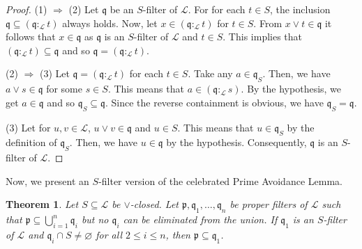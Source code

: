 \documentclass[preprint,review,10pt]{amsart}
\newtheorem{theorem}{Theorem}[section]
\theoremstyle{definition}
\theoremstyle{remark}
\numberwithin{equation}{section}
\begin{document}
\begin{proof}
(1) $\Longrightarrow$ (2) Let $\mathfrak {q}$ be an $S$-filter of $\mathscr{L}$. For for each $t \in S$, the inclusion $\mathfrak {q} \subseteq (\mathfrak {q} :_{\mathscr{L}}t)$ always holds. Now, let $x \in (\mathfrak {q} :_{\mathscr{L}}t)$ for $t \in S$. From $x \vee t \in \mathfrak {q}$ it follows that $x \in \mathfrak {q}$ as  $\mathfrak {q}$ is an $S$-filter of $\mathscr{L}$ and $t \in S$. This implies that $(\mathfrak {q} :_{\mathscr{L}}t) \subseteq \mathfrak {q}$ and so  $\mathfrak {q}=(\mathfrak {q} :_{\mathscr{L}}t)$.

(2) $\Longrightarrow$ (3) Let $\mathfrak {q}=(\mathfrak {q} :_{\mathscr{L}}t)$ for each $t \in S$. Take any $a \in \mathfrak {q}_S$. Then, we have $a \vee s \in \mathfrak {q}$ for some $s \in S$. This means that $a \in (\mathfrak {q} :_{\mathscr{L}}s)$. By the hypothesis, we get $a \in \mathfrak {q}$ and so $\mathfrak{q}_S \subseteq \mathfrak{q}$. Since  the reverse containment is obvious, we have $\mathfrak{q}_S=\mathfrak{q}$.


(3) Let for $u,v \in \mathscr{L}$, $u \vee v \in \mathfrak {q}$ and $u \in S$. This means that $u \in \mathfrak{q}_S$ by the definition of $\mathfrak{q}_S$. Then, we have $u \in \mathfrak{q}$ by the hypothesis. Consequently, $\mathfrak {q}$ is an $S$-filter of $\mathscr{L}$.
\end{proof}
Now, we present an  $S$-filter version of the celebrated Prime Avoidance Lemma.
\begin{theorem} \label{3}
Let $S \subseteq \mathscr{L}$ be   $\vee$-closed. Let $\mathfrak {p},\mathfrak{q}_1,\ldots,  \mathfrak{q}_n$ be proper filters of $\mathscr{L}$ such that $\mathfrak{p} \subseteq \bigcup_{i=1}^n \mathfrak{q}_i$ but no $\mathfrak{q}_i$ can be eliminated from the union. If $\mathfrak{q}_1$ is an $S$-filter of $\mathscr{L}$ and $\mathfrak{q}_i \cap S \neq \varnothing$ for all $2 \leq i \leq n$, then   $\mathfrak{p} \subseteq   \mathfrak{q}_1$.
\end{theorem}
 
\end{document}
